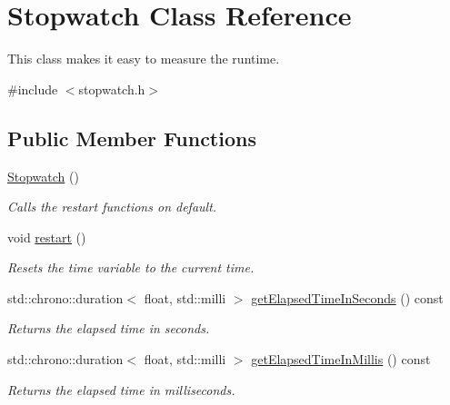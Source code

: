 \hypertarget{class_stopwatch}{}\section{Stopwatch Class Reference}
\label{class_stopwatch}


This class makes it easy to measure the runtime.  




{\ttfamily \#include $<$stopwatch.\+h$>$}

\subsection*{Public Member Functions}
\begin{DoxyCompactItemize}
\item 
\mbox{\label{class_stopwatch_a628b5ebeed5df065dd847e68fb6336cf}} 
\mbox{\hyperlink{class_stopwatch_a628b5ebeed5df065dd847e68fb6336cf}{Stopwatch}} ()
\begin{DoxyCompactList}\small\item\em Calls the restart functions on default. \end{DoxyCompactList}\item 
\mbox{\label{class_stopwatch_acd64e7c6f80445f25640e7a5dbd4b3be}} 
void \mbox{\hyperlink{class_stopwatch_acd64e7c6f80445f25640e7a5dbd4b3be}{restart}} ()
\begin{DoxyCompactList}\small\item\em Resets the time variable to the current time. \end{DoxyCompactList}\item 
std\+::chrono\+::duration$<$ float, std\+::milli $>$ \mbox{\hyperlink{class_stopwatch_a8fd9786f99abeb8289ba235d0e47cf26}{get\+Elapsed\+Time\+In\+Seconds}} () const
\begin{DoxyCompactList}\small\item\em Returns the elapsed time in seconds. \end{DoxyCompactList}\item 
std\+::chrono\+::duration$<$ float, std\+::milli $>$ \mbox{\hyperlink{class_stopwatch_a5d69cdef517efa260d22218ffc2646d3}{get\+Elapsed\+Time\+In\+Millis}} () const
\begin{DoxyCompactList}\small\item\em Returns the elapsed time in milliseconds. \end{DoxyCompactList}\end{DoxyCompactItemize}
